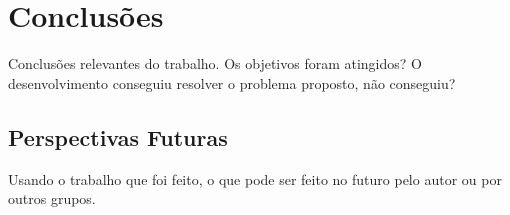 


\chapter{Conclusões}

\label{CapConclusoes}

Conclusões relevantes do trabalho. Os objetivos foram atingidos? O
desenvolvimento conseguiu resolver o problema proposto, não conseguiu? 


\section{Perspectivas Futuras}

Usando o trabalho que foi feito, o que pode ser feito no futuro pelo
autor ou por outros grupos.

